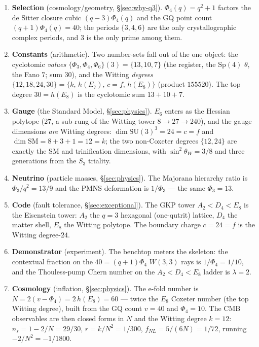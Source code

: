 \documentclass[11pt]{article}
\newcommand{\W}{W(3,3)}
\begin{document}
\begin{enumerate}\itemsep2pt
\item \textbf{Selection} (cosmology/geometry, \S\ref{sec:why-q3}). $\Phi_4(q)=q^2+1$
  factors the de Sitter closure cubic $(q-3)\Phi_4(q)$ and the $\mathrm{GQ}$ point
  count $(q+1)\Phi_4(q)=40$; the periods $\{3,4,6\}$ are the only crystallographic
  complex periods, and $3$ is the only prime among them.
\item \textbf{Constants} (arithmetic). Two number-sets fall out of the one object:
  the cyclotomic \emph{values} $\{\Phi_3,\Phi_4,\Phi_6\}(3)=\{13,10,7\}$ (the
  register, the $\mathrm{Sp}(4)$ $\theta$, the Fano $7$; sum $30$), and the Witting
  \emph{degrees} $\{12,18,24,30\}=\{k,\,h(E_7),\,c{=}f,\,h(E_8)\}$ (product
  $155520$). The top degree $30=h(E_8)$ is the cyclotomic sum $13{+}10{+}7$.
\item \textbf{Gauge} (the Standard Model, \S\ref{sec:physics}). $E_6$ enters as the
  Hessian polytope ($27$, a sub-rung of the Witting tower $8\!\to\!27\!\to\!240$), and
  the gauge dimensions \emph{are} Witting degrees: $\dim\mathrm{SU}(3)^3=24=c{=}f$ and
  $\dim\mathrm{SM}=8{+}3{+}1=12=k$; the two non-Coxeter degrees $\{12,24\}$ are exactly
  the SM and trinification dimensions, with $\sin^2\theta_W=3/8$ and three generations
  from the $S_3$ triality.
\item \textbf{Neutrino} (particle masses, \S\ref{sec:physics}). The Majorana
  hierarchy ratio is $\Phi_3/q^2=13/9$ and the PMNS deformation is $1/\Phi_3$ ---
  the same $\Phi_3=13$.
\item \textbf{Code} (fault tolerance, \S\ref{sec:exceptional}). The GKP tower
  $A_2<D_4<E_8$ is the Eisenstein tower: $A_2$ the $q=3$ hexagonal (one-qutrit)
  lattice, $D_4$ the matter shell, $E_8$ the Witting polytope. The boundary charge
  $c=24=f$ is the Witting degree-$24$.
\item \textbf{Demonstrator} (experiment). The benchtop meters the skeleton: the
  contextual fraction on the $40=(q{+}1)\Phi_4$ $\W$ rays is $1/\Phi_4=1/10$, and the
  Thouless-pump Chern number on the $A_2<D_4<E_8$ ladder is $\lambda=2$.
\item \textbf{Cosmology} (inflation, \S\ref{sec:physics}). The e-fold number is
  $N=2(v-\Phi_4)=2\,h(E_8)=60$ --- twice the $E_8$ Coxeter number (the top Witting
  degree), built from the GQ count $v=40$ and $\Phi_4=10$. The CMB observables are
  then closed forms in $N$ and the Witting degree $k=12$: $n_s=1-2/N=29/30$,
  $r=k/N^2=1/300$, $f_{NL}=5/(6N)=1/72$, running $-2/N^2=-1/1800$.
\end{enumerate}
\end{document}

